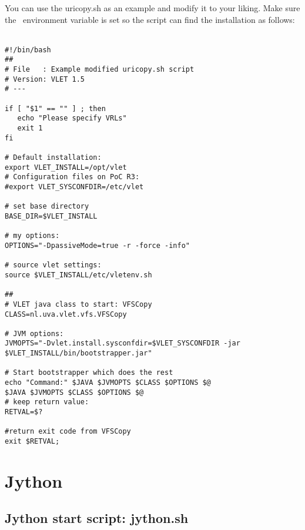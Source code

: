 You can use the uricopy.sh as an example and modify it to your liking. Make sure 
the \VLETINSTALL\ environment variable is set so the script can find the
installation as follows: \\
\\
\hspace*{5mm}\begin{boxedminipage}{165mm}
\begin{verbatim}
#!/bin/bash 
##
# File   : Example modified uricopy.sh script 
# Version: VLET 1.5
# --- 

if [ "$1" == "" ] ; then
   echo "Please specify VRLs" 
   exit 1
fi
  
# Default installation: 
export VLET_INSTALL=/opt/vlet
# Configuration files on PoC R3: 
#export VLET_SYSCONFDIR=/etc/vlet

# set base directory 
BASE_DIR=$VLET_INSTALL

# my options: 
OPTIONS="-DpassiveMode=true -r -force -info"

# source vlet settings: 
source $VLET_INSTALL/etc/vletenv.sh 

##
# VLET java class to start: VFSCopy 
CLASS=nl.uva.vlet.vfs.VFSCopy

# JVM options: 
JVMOPTS="-Dvlet.install.sysconfdir=$VLET_SYSCONFDIR -jar $VLET_INSTALL/bin/bootstrapper.jar"

# Start bootstrapper which does the rest 
echo "Command:" $JAVA $JVMOPTS $CLASS $OPTIONS $@
$JAVA $JVMOPTS $CLASS $OPTIONS $@
# keep return value: 
RETVAL=$? 

#return exit code from VFSCopy
exit $RETVAL; 
\end{verbatim}
\end{boxedminipage}

\section{Jython}

\subsection{Jython start script: jython.sh}

